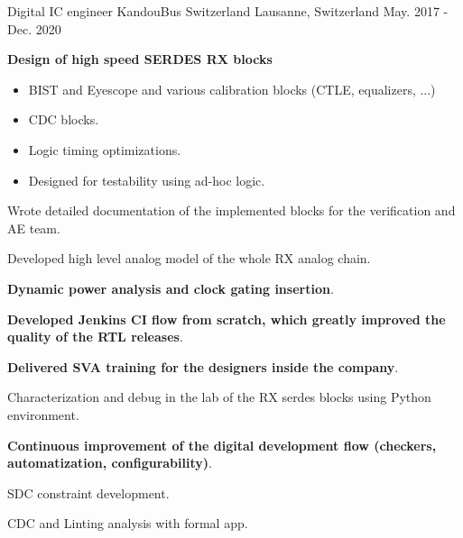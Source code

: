 

\begin{cventries}

  \cventry
    {Digital IC engineer} %
    {KandouBus Switzerland} %
    {Lausanne, Switzerland} %
    {May. 2017 - Dec. 2020} %
    {
      \begin{cvitems} %
        \item {\textbf{Design of high speed SERDES RX blocks}}
        \begin{itemize}
          \item {BIST and Eyescope and various calibration blocks (CTLE, equalizers, ...)}
          \item {CDC blocks.}
          \item {Logic timing optimizations.}
          \item {Designed for testability using ad-hoc logic.}
        \end{itemize}
        \item {Wrote detailed documentation of the implemented blocks for the verification and AE team.}
        \item {Developed high level analog model of the whole RX analog chain.}
        \item {\textbf{Dynamic power analysis and clock gating insertion}.}
        \item {\textbf{Developed Jenkins CI flow from scratch, which greatly improved the quality of the RTL releases}.}
        \item {\textbf{Delivered SVA training for the designers inside the company}.}
        \item {Characterization and debug in the lab of the RX serdes blocks using Python environment.}
        \item {\textbf{Continuous improvement of the digital development flow (checkers, automatization, configurability)}.}
        \item {SDC constraint development.}
        \item {CDC and Linting analysis with formal app.}

\end{cvitems}}
\end{cventries}
